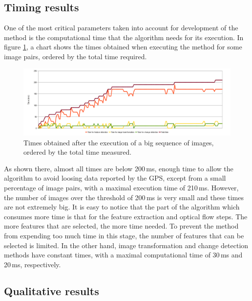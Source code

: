 \subsection{Timing results}\label{ch:chapter01_02_03}

One of the most critical parameters taken into account for development of the method is the computational time that the algorithm needs for its execution. In figure \ref{fig:cp01_times}, a chart shows the times obtained when executing the method for some image pairs, ordered by the total time required.

\begin{figure}[t]
\centering
\includegraphics[width=\textwidth]{times}
\caption{Times obtained after the execution of a big sequence of images, ordered by the total time measured.}\label{fig:cp01_times}
\end{figure}

As shown there, almost all times are below 200\,ms, enough time to allow the algorithm to avoid loosing data reported by the \ac{GPS}, except from a small percentage of image pairs, with a maximal execution time of 210\,ms. However, the number of images over the threshold of 200\,ms is very small and these times are not extremely big. It is easy to notice that the part of the algorithm which consumes more time is that for the feature extraction and optical flow steps. The more features that are selected, the more time needed. To prevent the method from expending too much time in this stage, the number of features that can be selected is limited. In the other hand, image transformation and change detection methods have constant times, with a maximal computational time of 30\,ms and 20\,ms, respectively.

\subsection{Qualitative results}\label{ch:chapter01_02_04}

